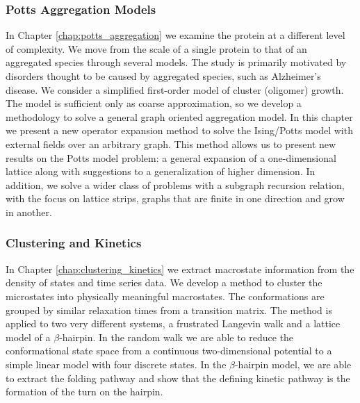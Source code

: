 \subsubsection{Potts Aggregation Models}
In Chapter \ref{chap:potts_aggregation} we examine the protein at a different level of complexity. We move from the scale of a single protein to that of an aggregated species through several models. The study is primarily motivated by disorders thought to be caused by aggregated species, such as Alzheimer's disease. We consider a simplified first-order model of cluster (oligomer) growth. The model is sufficient only as coarse approximation, so we develop a methodology to solve a general graph oriented aggregation model. In this chapter we present a new operator expansion method to solve the Ising/Potts model with external fields over an arbitrary graph. This method allows us to present new results on the Potts model problem: a general expansion of a one-dimensional lattice along with suggestions to a generalization of higher dimension. In addition, we solve a wider class of problems with a subgraph recursion relation, with the focus on lattice strips, graphs that are finite in one direction and grow in another.

\subsubsection{Clustering and Kinetics}
In Chapter \ref{chap:clustering_kinetics} we extract macrostate information from the density of states and time series data. We develop a method to cluster the microstates into physically meaningful macrostates. The conformations are grouped by similar relaxation times from a transition matrix.  The method is applied to two very different systems, a frustrated Langevin walk and a lattice model of a $\beta$-hairpin. In the random walk we are able to reduce the conformational state space from a continuous two-dimensional potential to a simple linear model with four discrete states. In the $\beta$-hairpin model, we are able to extract the folding pathway and show that the defining kinetic pathway is the formation of the turn on the hairpin.
